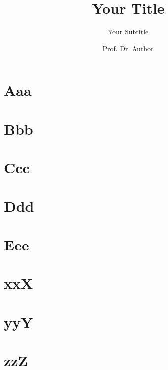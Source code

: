 \documentclass[aspectratio=169]{beamer}
\author{Prof. Dr. Author}
\title{Your Title}
\subtitle{Your Subtitle}
\begin{document}
\frame[allowframebreaks]{\sectionpage}

\section{Aaa}
\section{Bbb}
\section{Ccc}
\section{Ddd}
\section{Eee}
\section{xxX}
\section{yyY}
\section{zzZ}
\end{document}
